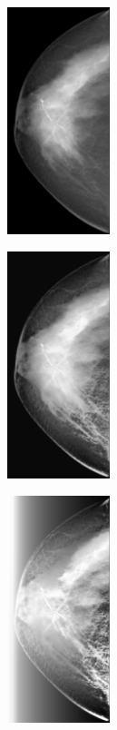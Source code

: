 \documentclass[spanish,twocolumn]{article}
\begin{document}
{\begin{minipage}[b]{1.0\linewidth}
   \begin{minipage}[t]{0.3\linewidth}  
   		\centering
        \includegraphics[width=3cm]{Figures/entropia_normal_ssim/imagen6.png}
  	\end{minipage}
  \hspace{1pt}
   \begin{minipage}[t]{0.3\linewidth}  
   		\centering
        \includegraphics[width=3cm]{Figures/entropia_normal_ssim/imagen6_2_2_0-031886.png}
  	\end{minipage}
   \begin{minipage}[t]{0.3\linewidth}  
   		\centering
        \includegraphics[width=3cm]{Figures/entropia_normal_ssim/imagen6_2_19_1.png}
  	\end{minipage}
  \vspace{0.5cm}
    \label{fig:resultado3}


\end{minipage}}
\end{document}
